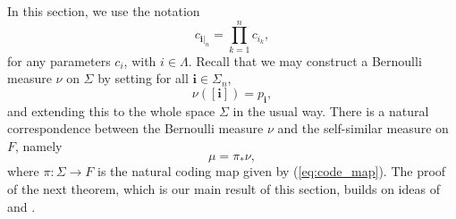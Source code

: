 \documentclass{PRM}
\theoremstyle{plain}
\theoremstyle{definition}
\theoremstyle{remark}
\begin{document}
In this section, we use the notation
\begin{equation*}
    c_{\mathbf{i}|_n}=\prod_{k=1}^nc_{i_k},
\end{equation*}
for any parameters $c_i$, with $i\in\Lambda$. Recall that we may construct a Bernoulli measure $\nu$ on $\Sigma$ by setting for all $\mathbf{i}\in\Sigma_n$,
\begin{equation*}
    \nu([\mathbf{i}])=p_{\mathbf{i}},
\end{equation*}
and extending this to the whole space $\Sigma$ in the usual way. There is a natural correspondence between the Bernoulli measure $\nu$ and the self-similar measure on $F$, namely
\begin{equation}\label{eq:bernoulli}
    \mu=\pi_*\nu,
\end{equation}
where $\pi\colon \Sigma\to F$ is the natural coding map given by (\ref{eq:code_map}). The proof of the next theorem, which is our main result of this section, builds on ideas of \cite{Yung} and \cite{FH}.
\end{document}
